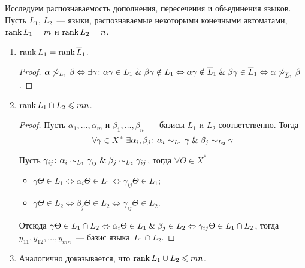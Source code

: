 Исследуем распознаваемость дополнения, пересечения и объединения языков.
Пусть $L_1$, $L_2$~--- языки, распознаваемые некоторыми конечными автоматами, $\operatorname{rank} L_1 = m$ и $\operatorname{rank} L_2 = n$.
\begin{enumerate}
	\item $\operatorname{rank} L_1 = \operatorname{rank} \overline L_1$.
	\begin{proof}
	$\alpha \not\sim_{L_1} \beta \Leftrightarrow
	\exists \gamma \colon \alpha \gamma \in L_1 \mathrel{\&} \beta \gamma \notin L_1 \Leftrightarrow
	\alpha \gamma \notin \overline L_1 \mathrel{\&} \beta \gamma \in \overline L_1 \Leftrightarrow
	\alpha \not\sim_{\overline L_1} \beta$.
	\end{proof}
	
	\item $\operatorname{rank} L_1 \cap L_2 \leqslant mn$.
	\begin{proof}
	Пусть $\alpha_1, \ldots, \alpha_m$ и $\beta_1, \ldots, \beta_n$~--- базисы $L_1$ и $L_2$ соответственно.
	Тогда
	\begin{equation*}
	\forall \gamma \in X^* \ \exists \alpha_i, \beta_j \colon \alpha_i \sim_{L_1} \gamma \mathrel{\&} \beta_j \sim_{L_2} \gamma
	\end{equation*}
	
	Пусть $\gamma_{ij} \colon \alpha_i \sim_{L_1} \gamma_{ij} \mathrel{\&} \beta_j \sim_{L_2} \gamma_{ij}$, тогда $\forall \Theta \in X^*$
	\begin{itemize}
		\item $\gamma \Theta \in L_1 \Leftrightarrow
		\alpha_i \Theta \in L_1 \Leftrightarrow
		\gamma_{ij} \Theta \in L_1$;
		\item $\gamma \Theta \in L_2 \Leftrightarrow
		\beta_j \Theta \in L_2 \Leftrightarrow
		\gamma_{ij} \Theta \in L_2$.
	\end{itemize}
	
	Отсюда $\gamma \Theta \in L_1 \cap L_2 \Leftrightarrow
	\alpha_i \Theta \in L_1 \mathrel{\&} \beta_j \in L_2 \Leftrightarrow
	\gamma_{ij} \Theta \in L_1 \cap L_2$, тогда $y_{11}, y_{12}, \ldots, y_{mn}$~--- базис языка~$L_1 \cap L_2$.
	\end{proof}
	
	\item Аналогично доказывается, что $\operatorname{rank} L_1 \cup L_2 \leqslant mn$.
\end{enumerate}

